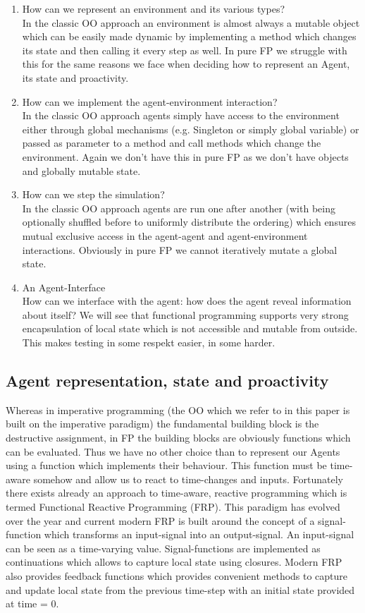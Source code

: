 \begin{enumerate}
	\item How can we represent an environment and its various types? \\
	In the classic OO approach an environment is almost always a mutable object which can be easily made dynamic by implementing a method which changes its state and then calling it every step as well. In pure FP we struggle with this for the same reasons we face when deciding how to represent an Agent, its state and proactivity.
	
	\item How can we implement the agent-environment interaction? \\
	In the classic OO approach agents simply have access to the environment either through global mechanisms (e.g. Singleton or simply global variable) or passed as parameter to a method and call methods which change the environment. Again we don't have this in pure FP as we don't have objects and globally mutable state.
	
	\item How can we step the simulation? \\
	In the classic OO approach agents are run one after another (with being optionally shuffled before to uniformly distribute the ordering) which ensures mutual exclusive access in the agent-agent and agent-environment interactions. Obviously in pure FP we cannot iteratively mutate a global state.

	\item An Agent-Interface \\
	How can we interface with the agent: how does the agent reveal information about itself? We will see that functional programming supports very strong encapsulation of local state which is not accessible and mutable from outside. This makes testing in some respekt easier, in some harder. 
\end{enumerate}

\subsection{Agent representation, state and proactivity}
Whereas in imperative programming (the OO which we refer to in this paper is built on the imperative paradigm) the fundamental building block is the destructive assignment, in FP the building blocks are obviously functions which can be evaluated.
Thus we have no other choice than to represent our Agents using a function which implements their behaviour. This function must be time-aware somehow and allow us to react to time-changes and inputs. Fortunately there exists already an approach to time-aware, reactive programming which is termed Functional Reactive Programming (FRP). This paradigm has evolved over the year and current modern FRP is built around the concept of a signal-function which transforms an input-signal into an output-signal. An input-signal can be seen as a time-varying value. Signal-functions are implemented as continuations which allows to capture local state using closures. Modern FRP also provides feedback functions which provides convenient methods to capture and update local state from the previous time-step with an initial state provided at time = 0.

